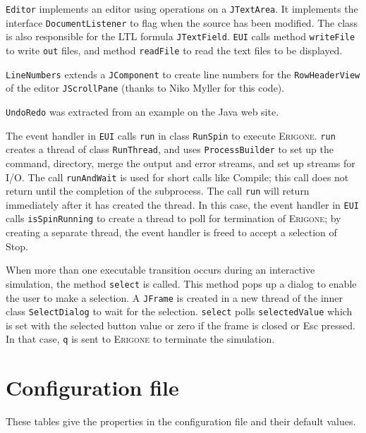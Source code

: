 \documentclass[11pt]{article}
\newcommand{\eri}{\textsc{Erigone}}
\newcommand{\p}[1]{\texttt{#1}}
\newcommand{\bu}[1]{\textsf{#1}}
\begin{document}
\p{Editor} implements an editor using operations on a \p{JTextArea}. It
implements the interface \p{Document\-Listener} to flag when the source
has been modified. The class is also responsible for the LTL formula
\p{JTextField}. \p{EUI} calls method \p{writeFile} to write \p{out}
files, and method \p{readFile} to read the text files to be displayed.

\p{LineNumbers} extends a \p{JComponent} to create line numbers for the
\p{RowHeaderView} of the editor \p{JScrollPane} (thanks to Niko Myller
for this code).

\p{UndoRedo} was extracted from an example on the Java web site.

The event handler in \p{EUI} calls \p{run} in class \p{RunSpin} to
execute \eri{}. \p{run} creates a thread of class \p{RunThread}, and
uses \p{ProcessBuilder} to set up the command, directory, merge the
output and error streams, and set up streams for I/O. The call
\p{runAndWait} is used for short calls like \bu{Compile}; this call does
not return until the completion of the subprocess. The call \p{run} will
return immediately after it has created the thread. In this case, the
event handler in \p{EUI} calls \p{isSpinRunning} to create a thread to
poll for termination of \eri{}; by creating a separate thread, the event
handler is freed to accept a selection of \bu{Stop}.

When more than one executable transition occurs during an interactive
simulation, the method \p{select} is called. This method pops up a
dialog to enable the user to make a selection. A \p{JFrame} is created
in a new thread of the inner class \p{SelectDialog} to wait for the
selection. \p{select} polls \p{selectedValue} which is set with the
selected button value or zero if the frame is closed or \bu{Esc}
pressed. In that case, \p{q} is sent to \eri{} to terminate the
simulation.

\appendix

\section{Configuration file}\label{a.cfg}

These tables give the properties in the configuration file and their
default values.
\end{document}
